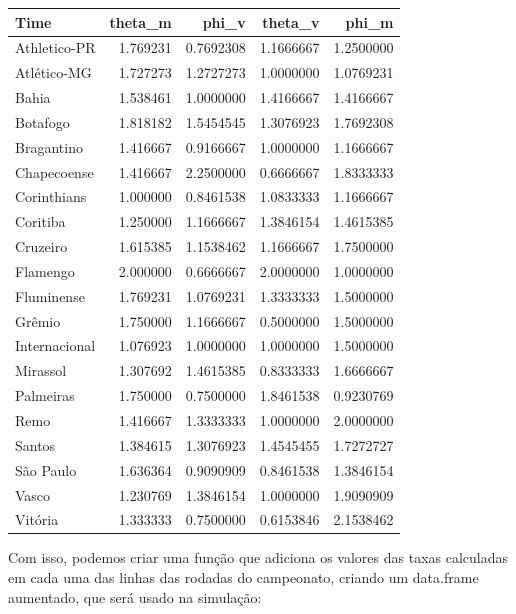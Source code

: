 \documentclass[11pt,]{article}
\begin{document}
\begin{longtable}[]{@{}lrrrr@{}}
\toprule\noalign{}
Time & theta\_m & phi\_v & theta\_v & phi\_m \\
\midrule\noalign{}
\endhead
\bottomrule\noalign{}
\endlastfoot
Athletico-PR & 1.769231 & 0.7692308 & 1.1666667 & 1.2500000 \\
Atlético-MG & 1.727273 & 1.2727273 & 1.0000000 & 1.0769231 \\
Bahia & 1.538461 & 1.0000000 & 1.4166667 & 1.4166667 \\
Botafogo & 1.818182 & 1.5454545 & 1.3076923 & 1.7692308 \\
Bragantino & 1.416667 & 0.9166667 & 1.0000000 & 1.1666667 \\
Chapecoense & 1.416667 & 2.2500000 & 0.6666667 & 1.8333333 \\
Corinthians & 1.000000 & 0.8461538 & 1.0833333 & 1.1666667 \\
Coritiba & 1.250000 & 1.1666667 & 1.3846154 & 1.4615385 \\
Cruzeiro & 1.615385 & 1.1538462 & 1.1666667 & 1.7500000 \\
Flamengo & 2.000000 & 0.6666667 & 2.0000000 & 1.0000000 \\
Fluminense & 1.769231 & 1.0769231 & 1.3333333 & 1.5000000 \\
Grêmio & 1.750000 & 1.1666667 & 0.5000000 & 1.5000000 \\
Internacional & 1.076923 & 1.0000000 & 1.0000000 & 1.5000000 \\
Mirassol & 1.307692 & 1.4615385 & 0.8333333 & 1.6666667 \\
Palmeiras & 1.750000 & 0.7500000 & 1.8461538 & 0.9230769 \\
Remo & 1.416667 & 1.3333333 & 1.0000000 & 2.0000000 \\
Santos & 1.384615 & 1.3076923 & 1.4545455 & 1.7272727 \\
São Paulo & 1.636364 & 0.9090909 & 0.8461538 & 1.3846154 \\
Vasco & 1.230769 & 1.3846154 & 1.0000000 & 1.9090909 \\
Vitória & 1.333333 & 0.7500000 & 0.6153846 & 2.1538462 \\
\end{longtable}

Com isso, podemos criar uma função que adiciona os valores das taxas
calculadas em cada uma das linhas das rodadas do campeonato, criando um
data.frame aumentado, que será usado na simulação:
\end{document}
